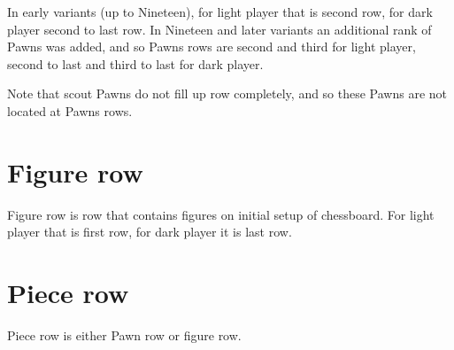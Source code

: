 In early variants (up to Nineteen), for light player that is second row, for
dark player second to last row. In Nineteen and later variants an additional
rank of Pawns was added, and so Pawns rows are second and third for light
player, second to last and third to last for dark player.

Note that scout Pawns do not fill up row completely, and so these Pawns are
not located at Pawns rows.

\section*{Figure row}
\label{sec:Terms/Figure row}
Figure row is row that contains figures on initial setup of chessboard.
For light player that is first row, for dark player it is last row.

\section*{Piece row}
\label{sec:Terms/Piece row}
Piece row is either Pawn row or figure row.

\clearpage %
